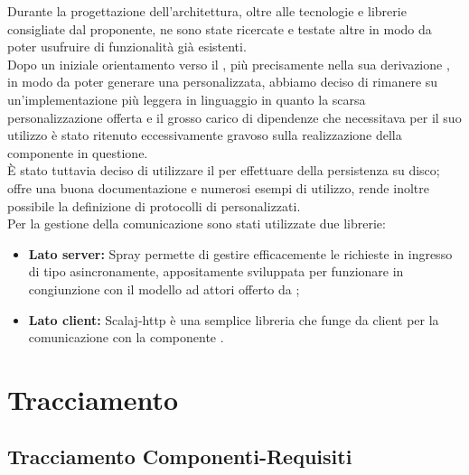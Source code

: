 \documentclass{scalatekids-article}
\begin{document}
Durante la progettazione dell'architettura, oltre alle tecnologie e librerie
consigliate dal proponente, ne sono state ricercate e testate altre in modo da
poter usufruire di funzionalità già esistenti.\\ Dopo un iniziale orientamento
verso il  , più precisamente nella sua
derivazione , in modo da poter generare una 
personalizzata, abbiamo deciso di rimanere su un'implementazione più leggera in
linguaggio  in quanto la scarsa personalizzazione offerta e il
grosso carico di dipendenze che necessitava  per il suo
utilizzo è stato ritenuto eccessivamente gravoso sulla realizzazione della
componente in questione.\\ È stato tuttavia deciso di utilizzare il
  per effettuare  della
persistenza su disco; offre una buona documentazione e numerosi esempi di
utilizzo, rende inoltre possibile la definizione di protocolli di
 personalizzati.\\
Per la gestione della comunicazione  sono stati utilizzate due librerie:
\begin{itemize}
\item\textbf{Lato server:} Spray permette di gestire efficacemente le richieste in ingresso
  di tipo  asincronamente, appositamente sviluppata per funzionare in congiunzione
  con il modello ad attori offerto da ;
\item\textbf{Lato client:} Scalaj-http è una semplice libreria  che funge da client
   per la comunicazione con la componente .
\end{itemize}

\section{Tracciamento}

\subsection{Tracciamento Componenti-Requisiti}
\end{document}
